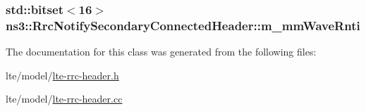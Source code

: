 \subsubsection[{\texorpdfstring{m\+\_\+mm\+Wave\+Rnti}{m_mmWaveRnti}}]{\setlength{\rightskip}{0pt plus 5cm}std\+::bitset$<$16$>$ ns3\+::\+Rrc\+Notify\+Secondary\+Connected\+Header\+::m\+\_\+mm\+Wave\+Rnti\hspace{0.3cm}{\ttfamily [private]}}\hypertarget{classns3_1_1RrcNotifySecondaryConnectedHeader_af2869b48f10ee1655497a46dacce7b49}{}\label{classns3_1_1RrcNotifySecondaryConnectedHeader_af2869b48f10ee1655497a46dacce7b49}


The documentation for this class was generated from the following files\+:\begin{DoxyCompactItemize}
\item 
lte/model/\hyperlink{lte-rrc-header_8h}{lte-\/rrc-\/header.\+h}\item 
lte/model/\hyperlink{lte-rrc-header_8cc}{lte-\/rrc-\/header.\+cc}\end{DoxyCompactItemize}

